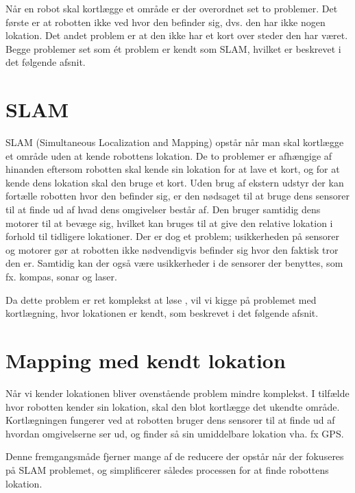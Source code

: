 Når en robot skal kortlægge et område er der overordnet set to problemer. 
Det første er at robotten ikke ved hvor den befinder sig, dvs. den har ikke nogen lokation.
Det andet problem er at den ikke har et kort over steder den har været.
Begge problemer set som ét problem er kendt som SLAM, hvilket er beskrevet i det følgende afsnit.

\section*{SLAM}\label{SLAM}
SLAM (Simultaneous Localization and Mapping) opstår når man skal kortlægge et område uden at kende robottens lokation.
De to problemer er afhængige af hinanden eftersom robotten skal kende sin lokation for at lave et kort, og for at kende dens lokation skal den bruge et kort.
Uden brug af ekstern udstyr der kan fortælle robotten hvor den befinder sig, er den nødsaget til at bruge dens sensorer til at finde ud af hvad dens omgivelser består af.
Den bruger samtidig dens motorer til at bevæge sig, hvilket kan bruges til at give den relative lokation i forhold til tidligere lokationer.
Der er dog et problem; usikkerheden på sensorer og motorer gør at robotten ikke nødvendigvis befinder sig hvor den faktisk tror den er.
Samtidig kan der også være usikkerheder i de sensorer der benyttes, som fx. kompas, sonar og laser.

Da dette problem er ret komplekst at løse \cite[s.~514]{thrun2002particle}, vil vi kigge på problemet med kortlægning, hvor lokationen er kendt, som beskrevet i det følgende afsnit.

\section*{Mapping med kendt lokation}\label{map_lok}
Når vi kender lokationen bliver ovenstående problem mindre komplekst.
I tilfælde hvor robotten kender sin lokation, skal den blot kortlægge det ukendte område.
Kortlægningen fungerer ved at robotten bruger dens sensorer til at finde ud af hvordan omgivelserne ser ud, og finder så sin umiddelbare lokation vha. fx GPS.

Denne fremgangsmåde fjerner mange af de reducere der opstår når der fokuseres på SLAM problemet, og simplificerer således processen for at finde robottens lokation.